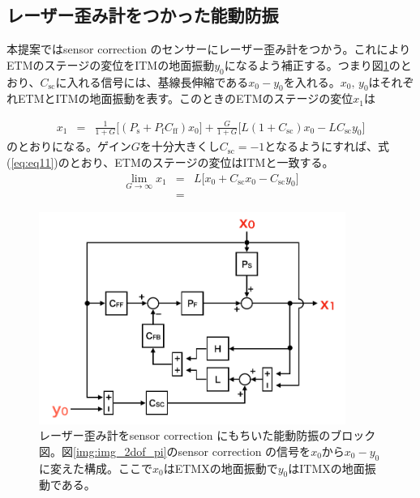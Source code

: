 \subsection{レーザー歪み計をつかった能動防振}

本提案ではsensor correction のセンサーにレーザー歪み計をつかう。これによりETMのステージの変位をITMの地面振動$y_0$になるよう補正する。つまり図\ref{img:img_pi_etmx}のとおり、$C_{\mathrm{sc}}$に入れる信号には、基線長伸縮である$x_0-y_0$を入れる。$x_0,\, y_0$はそれぞれETMとITMの地面振動を表す。このときのETMのステージの変位$x_1$は

\begin{eqnarray}
  x_1 &=& \frac{1}{1+G}\Biggl[(P_{\mathrm{s}}+P_{\mathrm{f}}C_{\mathrm{ff}})x_0\Biggl]
  + \frac{G}{1+G}\Biggl[L(1+C_{\mathrm{sc}})x_0 - LC_{\mathrm{sc}}y_0\Biggl]
\end{eqnarray}
のとおりになる。ゲイン$G$を十分大きくし$C_{\mathrm{sc}}=-1$となるようにすれば、式(\ref{eq:eq11})のとおり、ETMのステージの変位はITMと一致する。
\begin{eqnarray}\label{eq:eq10}
  \lim_{G \to \infty} x_{1} &=& L\Biggl[x_0+C_{\mathrm{sc}}x_0-C_{\mathrm{sc}}y_0\Biggl] \\
  &=&  
\end{eqnarray}


\begin{figure}[H]
  \begin{center}
    \includegraphics[width=10.0cm]{../arm_length_compensation_system/img_pi_etmx.png}
  \end{center}
  \caption{レーザー歪み計をsensor correction にもちいた能動防振のブロック図。図\ref{img:img_2dof_pi}のsensor correction の信号を$x_0$から$x_0-y_0$に変えた構成。ここで$x_0$はETMXの地面振動で$y_0$はITMXの地面振動である。}\label{img:img_pi_etmx}
\end{figure}


